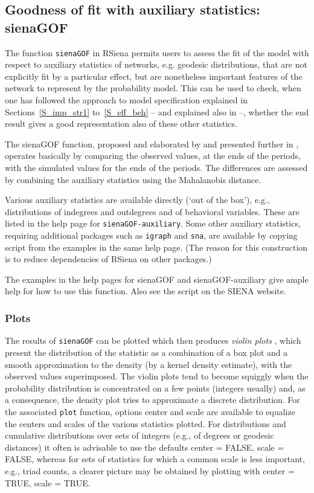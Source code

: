 \documentclass[a4paper,fleqn,11pt]{article}
\newcommand{\+}{\, + \,}
\newcommand{\sfn}[1]{\textsf{#1}}
\newcommand{\RS}{{\sf \textsf{RSiena} }}
\newcommand{\SI}{{\sf SIENA }}
\begin{document}
\subsection{Goodness of fit with auxiliary statistics: \textsf{sienaGOF}}
\label{S_gof}

The function  \verb!sienaGOF! in \RS permits users
to assess the fit of the model with respect to
auxiliary statistics of networks, e.g. geodesic distributions,
that are not explicitly fit by a particular effect,
but are nonetheless important features of the network to represent by the
probability model.
This can be used to check, when one has followed the approach to
model specification explained in Sections~\ref{S_imp_str1}
to~\ref{S_eff_beh} -- and explained also in \citet{SnijdersEA10b} --,
whether the end result gives a good representation
also of these other statistics.

The \textsf{sienaGOF} function, proposed and elaborated by
\citet{Lospinoso2012} and presented further
in \citet{LospinosoSnijders2019}, operates basically by comparing
the observed values, at the ends of the periods, with the
simulated values for the ends of the periods.
The differences are assessed by combining the auxiliary statistics
using the Mahalanobis distance.

Various auxiliary statistics are available directly (`out of the box'),
e.g., distributions of indegrees and outdegrees and of behavioral
variables. These are listed in the help page for
\verb!sienaGOF-auxiliary!. Some other auxiliary statistics, requiring
additional packages such as \texttt{igraph} and \texttt{sna},
are available by copying script from the examples in the same help page.
(The reason for this construction is to reduce dependencies
of \RS on other packages.)

The examples in the help pages for \textsf{sienaGOF} and \sfn{sienaGOF-auxiliary}
give ample help for how to use this function.
Also see the script on the \SI website.


\subsubsection{Plots}
The results of \verb!sienaGOF! can be plotted which then produces
\emph{violin plots} \citep{HintzeNelson1998}, which present
the distribution of the statistic as a combination
of a box plot and a smooth approximation to the density
(by a kernel density estimate), with the observed values superimposed.
The violin plots tend to become squiggly when the probability distribution
is concentrated on a few points (integers usually) and, as a consequence,
the density plot tries to approximate a discrete distribution.
For the associated \verb!plot! function, options \sfn{center} and \sfn{scale}
are available to equalize the centers and scales of the various statistics
plotted.
For distributions and cumulative distributions over sets of integers
(e.g., of degrees or geodesic distances)
it often is advisable to use the defaults \sfn{center = FALSE},
\sfn{scale = FALSE}, whereas for sets of statistics for which a common scale
is less important, e.g., triad counts, a clearer picture may be obtained by
plotting with \sfn{center = TRUE}, \sfn{scale = TRUE}.
\end{document}
